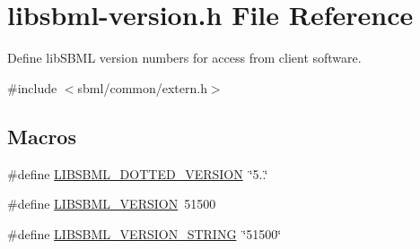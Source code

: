 \hypertarget{libsbml-version_8h}{}\section{libsbml-\/version.h File Reference}
\label{libsbml-version_8h}


Define lib\+S\+B\+ML version numbers for access from client software.  


{\ttfamily \#include $<$sbml/common/extern.\+h$>$}\newline
\subsection*{Macros}
\begin{DoxyCompactItemize}
\item 
\#define \hyperlink{libsbml-version_8h_a17f1fee6d4ec7ae02dd3abd2738cc0c0}{L\+I\+B\+S\+B\+M\+L\+\_\+\+D\+O\+T\+T\+E\+D\+\_\+\+V\+E\+R\+S\+I\+ON}~\char`\"{}5..\char`\"{}
\item 
\#define \hyperlink{libsbml-version_8h_a8daa984f64b730c902f99993db926f0b}{L\+I\+B\+S\+B\+M\+L\+\_\+\+V\+E\+R\+S\+I\+ON}~51500
\item 
\#define \hyperlink{libsbml-version_8h_a2fa7937f4635ec0b2551d6517b5e4bd5}{L\+I\+B\+S\+B\+M\+L\+\_\+\+V\+E\+R\+S\+I\+O\+N\+\_\+\+S\+T\+R\+I\+NG}~\char`\"{}51500\char`\"{}
\end{DoxyCompactItemize}
